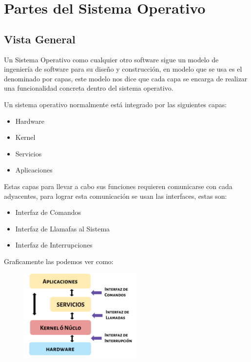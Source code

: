 \documentclass[12pt, fleqn]{report}                             %
\begin{document}
        \section{Partes del Sistema Operativo}

            \subsection{Vista General}

                Un Sistema Operativo como cualquier otro software sigue un modelo de ingeniería de
                software para su diseño y construcción, en modelo que se usa es el denominado por capas,
                este modelo nos dice que cada capa se encarga de realizar una funcionalidad concreta
                dentro del sistema operativo.

                Un sistema operativo normalmente está integrado por las siguientes capas:
                \begin{itemize}
                    \item Hardware
                    \item Kernel
                    \item Servicios        
                    \item Aplicaciones
                \end{itemize}  

                Estas capas para llevar a cabo sus funciones requieren comunicarse con cada adyacentes,
                para lograr esta comunicación se usan las interfaces,
                estas son:
                \begin{itemize}
                    \item Interfaz de Comandos
                    \item Interfaz de Llamafas al Sistema
                    \item Interfaz de Interrupciones        
                \end{itemize}  


                Graficamente las podemos ver como:

                \begin{figure}[h!]
                    \centering
                    \includegraphics[width=0.55\textwidth]{Capas}
                \end{figure}
\end{document}
